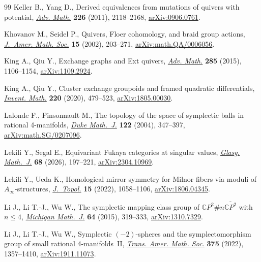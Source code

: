 \begin{thebibliography}{99}
Keller B., Yang D., Derived equivalences from mutations of quivers with
 potential, \href{https://doi.org/10.1016/j.aim.2010.09.019}{\textit{Adv.
 Math.}} \textbf{226} (2011), 2118--2168,
 \href{http://arxiv.org/abs/0906.0761}{arXiv:0906.0761}.

Khovanov M., Seidel P., Quivers, {F}loer cohomology, and braid group actions,
 \href{https://doi.org/10.1090/S0894-0347-01-00374-5}{\textit{J.~Amer. Math.
 Soc.}} \textbf{15} (2002), 203--271,
 \href{http://arxiv.org/abs/math.QA/0006056}{arXiv:math.QA/0006056}.

King A., Qiu Y., Exchange graphs and {E}xt quivers,
 \href{https://doi.org/10.1016/j.aim.2015.08.017}{\textit{Adv. Math.}}
 \textbf{285} (2015), 1106--1154,
 \href{http://arxiv.org/abs/1109.2924}{arXiv:1109.2924}.

King A., Qiu Y., Cluster exchange groupoids and framed quadratic differentials,
 \href{https://doi.org/10.1007/s00222-019-00932-y}{\textit{Invent. Math.}}
 \textbf{220} (2020), 479--523,
 \href{http://arxiv.org/abs/1805.00030}{arXiv:1805.00030}.

Lalonde F., Pinsonnault M., The topology of the space of symplectic balls in
 rational 4-manifolds,
 \href{https://doi.org/10.1215/S0012-7094-04-12223-7}{\textit{Duke Math.~J.}}
 \textbf{122} (2004), 347--397,
 \href{http://arxiv.org/abs/math.SG/0207096}{arXiv:math.SG/0207096}.

Lekili Y., Segal E., Equivariant {F}ukaya categories at singular values,
 \href{https://doi.org/10.1017/s0017089525100487}{\textit{Glasg. Math.~J.}}
 \textbf{68} (2026), 197--221,
 \href{http://arxiv.org/abs/2304.10969}{arXiv:2304.10969}.

Lekili Y., Ueda K., Homological mirror symmetry for {M}ilnor fibers via moduli
 of {$A_\infty$}-structures,
 \href{https://doi.org/10.1112/topo.12248}{\textit{J.~Topol.}} \textbf{15}
 (2022), 1058--1106, \href{http://arxiv.org/abs/1806.04345}{arXiv:1806.04345}.

Li J., Li T.-J., Wu W., The symplectic mapping class group of {$\mathbb
 CP^2\#n\overline{\mathbb CP^2}$} with {$n \le 4$},
 \href{https://doi.org/10.1307/mmj/1434731926}{\textit{Michigan Math.~J.}}
 \textbf{64} (2015), 319--333,
 \href{http://arxiv.org/abs/1310.7329}{arXiv:1310.7329}.

Li J., Li T.-J., Wu W., Symplectic {$(-2)$}-spheres and the symplectomorphism
 group of small rational 4-manifolds~{II},
 \href{https://doi.org/10.1090/tran/8517}{\textit{Trans. Amer. Math. Soc.}}
 \textbf{375} (2022), 1357--1410,
 \href{http://arxiv.org/abs/1911.11073}{arXiv:1911.11073}.


\end{thebibliography}
